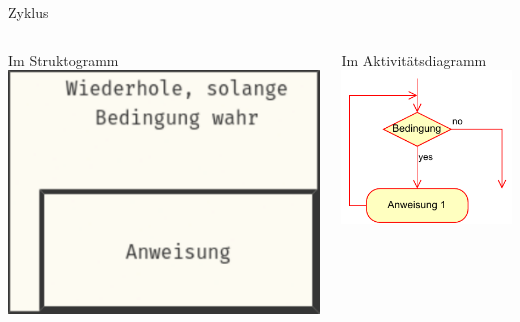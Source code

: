 \documentclass[xelatex,aspectratio=169]{beamer}
\begin{document}
\begin{frame}{Zyklus}

  \begin{columns}[t]
    \begin{column}{.3\linewidth}
      \begin{block}{Im Struktogramm}
        \centering
        \includegraphics[width=\textwidth]{fig/algorithmus_zyklus_struktogram.pdf}
      \end{block}
    \end{column}
    \begin{column}{.3\linewidth}
      \begin{block}{Im Aktivitätsdiagramm}
        \centering
        \includegraphics[width=\textwidth]{fig/algorithmus_zyklus_aktivitaetsdiagram.drawio.pdf}
      \end{block}


\end{column}
\end{columns}
\end{frame}
\end{document}
